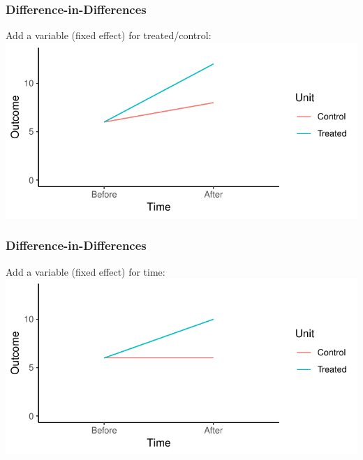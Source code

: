 \documentclass[xcolor=x11names,compress]{beamer}\usepackage[]{graphicx}\usepackage[]{color}
\makeatletter
\def\maxwidth{ %
  \ifdim\Gin@nat@width>\linewidth
    \linewidth
  \else
    \Gin@nat@width
  \fi
}
\newenvironment{knitrout}{}{} %
\renewcommand{\(}{\begin{columns}}
\renewcommand{\)}{\end{columns}}
\newcommand{\<}[1]{\begin{column}{#1}}
\renewcommand{\>}{\end{column}}
\makeatother
\begin{document}
\begin{frame}
\frametitle{Difference-in-Differences}
Add a variable (fixed effect) for treated/control:
\begin{knitrout}
\color{fgcolor}
\includegraphics[width=\maxwidth]{figure/DinD_chart3-1} 

\end{knitrout}
\end{frame}

\begin{frame}
\frametitle{Difference-in-Differences}
Add a variable (fixed effect) for time:
\begin{knitrout}
\color{fgcolor}
\includegraphics[width=\maxwidth]{figure/DinD_chart4-1} 

\end{knitrout}
\end{frame}
\end{document}
